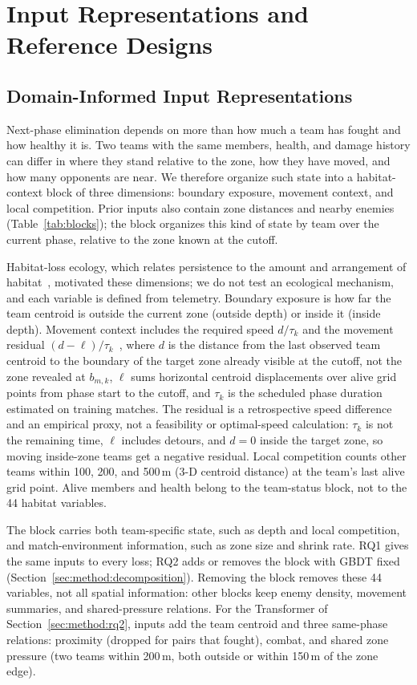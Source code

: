 \documentclass[sigconf,anonymous]{acmart}
\begin{document}
\section{Input Representations and Reference Designs}
\label{sec:method:design}
\subsection{Domain-Informed Input Representations}
\label{sec:method:representation}
Next-phase elimination depends on more than how much a team has fought and how healthy it is. Two teams with the same members, health, and damage history can differ in where they stand relative to the zone, how they have moved, and how many opponents are near. We therefore organize such state into a habitat-context block of three dimensions: boundary exposure, movement context, and local competition. Prior inputs also contain zone distances and nearby enemies (Table~\ref{tab:blocks}); the block organizes this kind of state by team over the current phase, relative to the zone known at the cutoff.

Habitat-loss ecology, which relates persistence to the amount and arrangement of habitat~\cite{Fahrig03}, motivated these dimensions; we do not test an ecological mechanism, and each variable is defined from telemetry. Boundary exposure is how far the team centroid is outside the current zone (outside depth) or inside it (inside depth). Movement context includes the required speed $d/\tau_k$ and the movement residual $(d-\ell)/\tau_k$~\cite{Nathan08}, where $d$ is the distance from the last observed team centroid to the boundary of the target zone already visible at the cutoff, not the zone revealed at $b_{m,k}$, $\ell$ sums horizontal centroid displacements over alive grid points from phase start to the cutoff, and $\tau_k$ is the scheduled phase duration estimated on training matches. The residual is a retrospective speed difference and an empirical proxy, not a feasibility or optimal-speed calculation: $\tau_k$ is not the remaining time, $\ell$ includes detours, and $d=0$ inside the target zone, so moving inside-zone teams get a negative residual. Local competition counts other teams within 100, 200, and 500\,m (3-D centroid distance) at the team's last alive grid point. Alive members and health belong to the team-status block, not to the 44 habitat variables.

The block carries both team-specific state, such as depth and local competition, and match-environment information, such as zone size and shrink rate. RQ1 gives the same inputs to every loss; RQ2 adds or removes the block with GBDT fixed (Section~\ref{sec:method:decomposition}). Removing the block removes these 44 variables, not all spatial information: other blocks keep enemy density, movement summaries, and shared-pressure relations. For the Transformer of Section~\ref{sec:method:rq2}, inputs add the team centroid and three same-phase relations: proximity (dropped for pairs that fought), combat, and shared zone pressure (two teams within 200\,m, both outside or within 150\,m of the zone edge).
\end{document}
